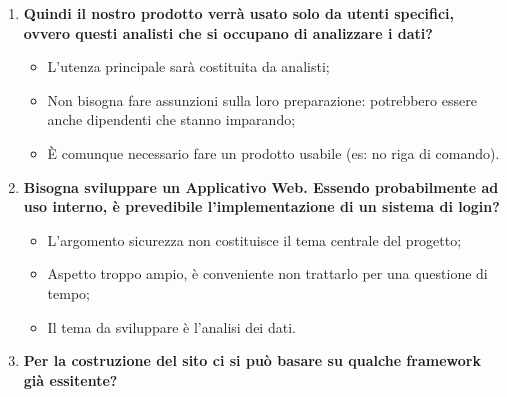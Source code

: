 \documentclass[11pt]{article}
\begin{document}
\begin{enumerate}
			\bigskip
			
			\item \textbf{Quindi il nostro prodotto verrà usato solo da utenti specifici, ovvero questi analisti che si occupano
			di analizzare i dati?}
			
			\medskip
			
			\begin{itemize}
				\item L'utenza principale sarà costituita da analisti;
				\item Non bisogna fare assunzioni sulla loro preparazione: potrebbero essere anche dipendenti che stanno imparando;
				\item È comunque necessario fare un prodotto usabile (es: no riga di comando).
			\end{itemize}
			
			\bigskip 
			
			\item \textbf{Bisogna sviluppare un Applicativo Web. Essendo probabilmente ad uso interno, è prevedibile
			l'implementazione di un sistema di login?}
			
			\medskip
			\begin{itemize}
				\item L'argomento sicurezza non costituisce il tema centrale del progetto;
				\item Aspetto troppo ampio, è conveniente non trattarlo per una questione di tempo;
				\item Il tema da sviluppare è l'analisi dei dati.
			\end{itemize}
			  
			\bigskip
			
			\item \textbf{Per la costruzione del sito ci si può basare su qualche framework già essitente?}
			

\end{enumerate}
\end{document}

